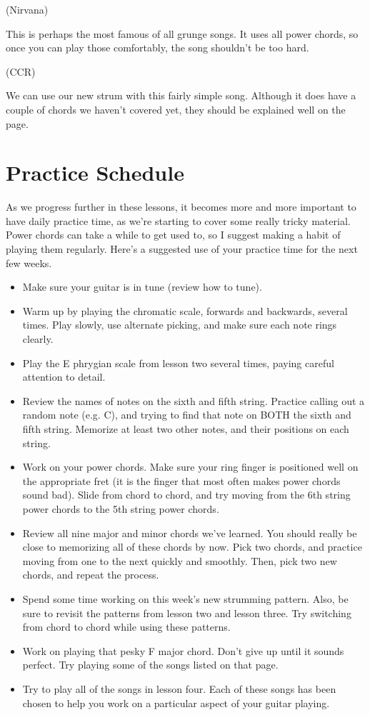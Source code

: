  (Nirvana)

This is perhaps the most famous of all grunge songs. It uses all power chords, so once you can play those comfortably, the song shouldn't be too hard.

 (CCR)

We can use our new strum with this fairly simple song. Although it does have a couple of chords we haven't covered yet, they should be explained well on the page.

\section{Practice Schedule}
As we progress further in these lessons, it becomes more and more important to
have daily practice time, as we're starting to cover some really tricky
material. Power chords can take a while to get used to, so I suggest making a
habit of playing them regularly. Here's a suggested use of your practice time
for the next few weeks.
%
\begin{itemize}
\item Make sure your guitar is in tune (review how to tune).
\item Warm up by playing the chromatic scale, forwards and backwards, several
      times. Play slowly, use alternate picking, and make sure each note rings
      clearly.
\item Play the E phrygian scale from lesson two several times, paying careful
      attention to detail.
\item Review the names of notes on the sixth and fifth string. Practice calling
      out a random note (e.g. C), and trying to find that note on BOTH the sixth and
      fifth string. Memorize at least two other notes, and their positions on each
      string.
\item Work on your power chords. Make sure your ring finger is positioned well
      on the appropriate fret (it is the finger that most often makes power chords
      sound bad). Slide from chord to chord, and try moving from the 6th string power
      chords to the 5th string power chords.
\item Review all nine major and minor chords we've learned. You should really
      be close to memorizing all of these chords by now. Pick two chords, and
      practice moving from one to the next quickly and smoothly. Then, pick two new
      chords, and repeat the process.
\item Spend some time working on this week's new strumming pattern. Also, be
      sure to revisit the patterns from lesson two and lesson three. Try switching
      from chord to chord while using these patterns.
\item Work on playing that pesky F major chord. Don't give up until it sounds
      perfect. Try playing some of the songs listed on that page.
\item Try to play all of the songs in lesson four. Each of these songs has been
      chosen to help you work on a particular aspect of your guitar playing.
\end{itemize}
